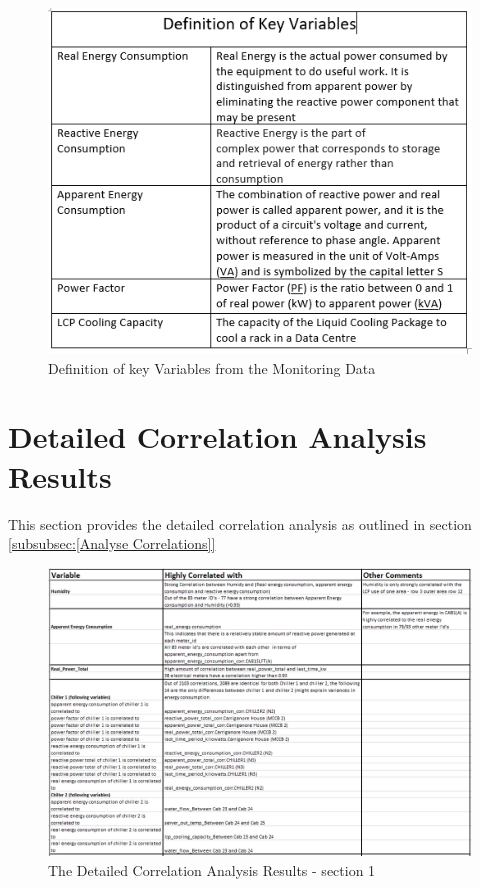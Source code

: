 \documentclass[12pt]{scrartcl}
\begin{document}
\begin{figure}[h]
  \caption{Definition of key Variables from the Monitoring Data}
  \label{fig:key_variables}
  \centering
    \includegraphics[scale=0.75]{key_variables}
\end{figure} 


\section{Detailed Correlation Analysis Results}
\label{sec:[Correlation Analysis Results]}
This section provides the detailed correlation analysis as outlined in section \ref{subsubsec:[Analyse Correlations]}





\begin{figure}[h]
  \caption{The Detailed Correlation Analysis Results - section 1}
  \label{fig:Correlation_Analysis_1}
  \centering
    \includegraphics[scale=0.50]{Correlation_Analysis_1}
\end{figure} 
\end{document}
